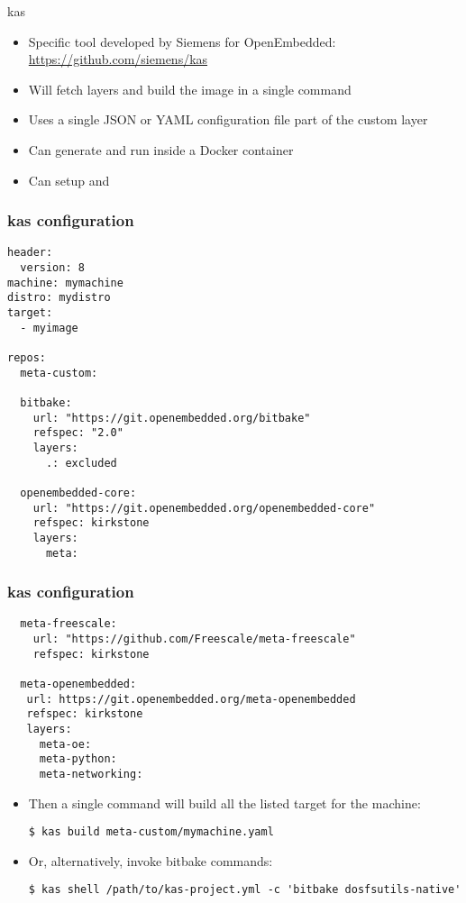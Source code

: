 \begin{frame}[fragile]{kas}
  \begin{itemize}
  \item Specific tool developed by Siemens for OpenEmbedded:
    \url{https://github.com/siemens/kas}
  \item Will fetch layers and build the image in a single command
  \item Uses a single JSON or YAML configuration file part of the
    custom layer
  \item Can generate and run inside a Docker container
  \item Can setup  and 
  \end{itemize}
\end{frame}

\begin{frame}[fragile]
  \frametitle{kas configuration}
  \begin{block}{}
  \fontsize{9}{9}\selectfont
  \begin{verbatim}
header:
  version: 8
machine: mymachine
distro: mydistro
target:
  - myimage

repos:
  meta-custom:

  bitbake:
    url: "https://git.openembedded.org/bitbake"
    refspec: "2.0"
    layers:
      .: excluded

  openembedded-core:
    url: "https://git.openembedded.org/openembedded-core"
    refspec: kirkstone
    layers:
      meta:
  \end{verbatim}
  \end{block}
\end{frame}

\begin{frame}[fragile]
  \frametitle{kas configuration}
  \fontsize{9}{9}\selectfont
  \begin{block}{}
  \begin{verbatim}
  meta-freescale:
    url: "https://github.com/Freescale/meta-freescale"
    refspec: kirkstone

  meta-openembedded:
   url: https://git.openembedded.org/meta-openembedded
   refspec: kirkstone
   layers:
     meta-oe:
     meta-python:
     meta-networking:
  \end{verbatim}
  \end{block}


  \begin{itemize}
  \item Then a single command will build all the listed target for the
machine:

  \begin{verbatim}
$ kas build meta-custom/mymachine.yaml
  \end{verbatim}

  \item Or, alternatively, invoke bitbake commands:

  \begin{verbatim}
$ kas shell /path/to/kas-project.yml -c 'bitbake dosfsutils-native'
  \end{verbatim}
  \end{itemize}
\end{frame}
